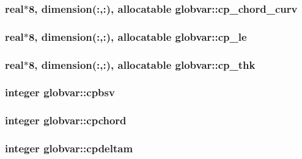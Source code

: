 \subsubsection[{cp\+\_\+chord\+\_\+curv}]{\setlength{\rightskip}{0pt plus 5cm}real$\ast$8, dimension(\+:,\+:), allocatable globvar\+::cp\+\_\+chord\+\_\+curv}\label{namespaceglobvar_a96dfca1007470c8ba8a1d5a54678775f}
\hypertarget{namespaceglobvar_aedf6762d5f8bc876b3c01afd7e8e6b41}{}
\subsubsection[{cp\+\_\+le}]{\setlength{\rightskip}{0pt plus 5cm}real$\ast$8, dimension(\+:,\+:), allocatable globvar\+::cp\+\_\+le}\label{namespaceglobvar_aedf6762d5f8bc876b3c01afd7e8e6b41}
\hypertarget{namespaceglobvar_a3959c8a967075c593a747c5c54b50a53}{}
\subsubsection[{cp\+\_\+thk}]{\setlength{\rightskip}{0pt plus 5cm}real$\ast$8, dimension(\+:,\+:), allocatable globvar\+::cp\+\_\+thk}\label{namespaceglobvar_a3959c8a967075c593a747c5c54b50a53}
\hypertarget{namespaceglobvar_ad4f4c8cbe26bb1d58d242e5ea327bd8f}{}
\subsubsection[{cpbsv}]{\setlength{\rightskip}{0pt plus 5cm}integer globvar\+::cpbsv}\label{namespaceglobvar_ad4f4c8cbe26bb1d58d242e5ea327bd8f}
\hypertarget{namespaceglobvar_a23b2b2fc255df014f0e8b7ab565c4001}{}
\subsubsection[{cpchord}]{\setlength{\rightskip}{0pt plus 5cm}integer globvar\+::cpchord}\label{namespaceglobvar_a23b2b2fc255df014f0e8b7ab565c4001}
\hypertarget{namespaceglobvar_a30666fa979088a7b9518a10063cd3ec6}{}
\subsubsection[{cpdeltam}]{\setlength{\rightskip}{0pt plus 5cm}integer globvar\+::cpdeltam}\label{namespaceglobvar_a30666fa979088a7b9518a10063cd3ec6}
\hypertarget{namespaceglobvar_a4ec3f324cc8dbfe8e5a71b25b9df4227}{}
